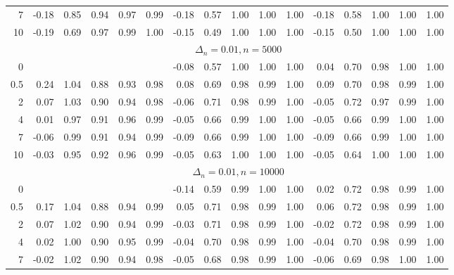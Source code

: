 \documentclass{article}
\theoremstyle{plain}
\theoremstyle{definition}
\theoremstyle{remark}
\begin{document}
\begin{appendix}
{\begin{table}[ht]
\begin{tabular}{r|rrrrr|rrrrr|rrrrr}
  7 & -0.18 & 0.85 & 0.94 & 0.97 & 0.99 & -0.18 & 0.57 & 1.00 & 1.00 & 1.00 & -0.18 & 0.58 & 1.00 & 1.00 & 1.00 \\ 
  10 & -0.19 & 0.69 & 0.97 & 0.99 & 1.00 & -0.15 & 0.49 & 1.00 & 1.00 & 1.00 & -0.15 & 0.50 & 1.00 & 1.00 & 1.00 \\ 
   \midrule
   &\multicolumn{15}{c}{$\Delta_n=0.01, n= 5000$}
   \\
0 &  &  &  &  &  & -0.08 & 0.57 & 1.00 & 1.00 & 1.00 & 0.04 & 0.70 & 0.98 & 1.00 & 1.00 \\ 
  0.5 & 0.24 & 1.04 & 0.88 & 0.93 & 0.98 & 0.08 & 0.69 & 0.98 & 0.99 & 1.00 & 0.09 & 0.70 & 0.98 & 0.99 & 1.00 \\ 
  2 & 0.07 & 1.03 & 0.90 & 0.94 & 0.98 & -0.06 & 0.71 & 0.98 & 0.99 & 1.00 & -0.05 & 0.72 & 0.97 & 0.99 & 1.00 \\ 
  4 & 0.01 & 0.97 & 0.91 & 0.96 & 0.99 & -0.05 & 0.66 & 0.99 & 1.00 & 1.00 & -0.05 & 0.66 & 0.99 & 1.00 & 1.00 \\ 
  7 & -0.06 & 0.99 & 0.91 & 0.94 & 0.99 & -0.09 & 0.66 & 0.99 & 1.00 & 1.00 & -0.09 & 0.66 & 0.99 & 1.00 & 1.00 \\ 
  10 & -0.03 & 0.95 & 0.92 & 0.96 & 0.99 & -0.05 & 0.63 & 1.00 & 1.00 & 1.00 & -0.05 & 0.64 & 1.00 & 1.00 & 1.00 \\ 
   \midrule
   &\multicolumn{15}{c}{$\Delta_n=0.01, n= 10000$}
   \\
 0 &  &  &  &  &  & -0.14 & 0.59 & 0.99 & 1.00 & 1.00 & 0.02 & 0.72 & 0.98 & 0.99 & 1.00 \\ 
  0.5 & 0.17 & 1.04 & 0.88 & 0.94 & 0.99 & 0.05 & 0.71 & 0.98 & 0.99 & 1.00 & 0.06 & 0.72 & 0.98 & 0.99 & 1.00 \\ 
  2 & 0.07 & 1.02 & 0.90 & 0.94 & 0.99 & -0.03 & 0.71 & 0.98 & 0.99 & 1.00 & -0.02 & 0.72 & 0.98 & 0.99 & 1.00 \\ 
  4 & 0.02 & 1.00 & 0.90 & 0.95 & 0.99 & -0.04 & 0.70 & 0.98 & 0.99 & 1.00 & -0.04 & 0.70 & 0.98 & 0.99 & 1.00 \\ 
  7 & -0.02 & 1.02 & 0.90 & 0.94 & 0.98 & -0.05 & 0.68 & 0.98 & 0.99 & 1.00 & -0.06 & 0.69 & 0.98 & 1.00 & 1.00 \\ 

\end{tabular}
\end{table}}
\end{appendix}
\end{document}
